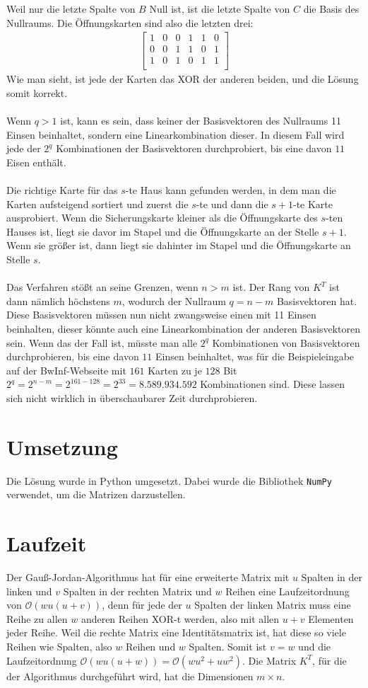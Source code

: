 \documentclass[a4paper,10pt,ngerman]{scrartcl}
\begin{document}
Weil nur die letzte Spalte von $B$ Null ist, ist die letzte Spalte von $C$ die Basis des Nullraums. Die Öffnungskarten sind also die letzten drei:
\begin{align*}
\left[\begin{array}{cccccc}
1 & 0 & 0 & 1 & 1 & 0 \\
0 & 0 & 1 & 1 & 0 & 1 \\
1 & 0 & 1 & 0 & 1 & 1 \\
\end{array}\right]
\end{align*}
Wie man sieht, ist jede der Karten das XOR der anderen beiden, und die Lösung somit korrekt. \\\\
Wenn $q>1$ ist, kann es sein, dass keiner der Basisvektoren des Nullraums 11 Einsen beinhaltet, sondern eine Linearkombination dieser. In diesem Fall wird jede der $2^q$ Kombinationen der Basisvektoren durchprobiert, bis eine davon $11$ Eisen enthält.\\\\
Die richtige Karte für das $s$-te Haus kann gefunden werden, in dem man die Karten aufsteigend sortiert und zuerst die $s$-te und dann die $s+1$-te Karte ausprobiert. Wenn die Sicherungskarte kleiner als die Öffnungskarte des $s$-ten Hauses ist, liegt sie davor im Stapel und die Öffnungskarte an der Stelle $s+1$. Wenn sie größer ist, dann liegt sie dahinter im Stapel und die Öffnungskarte an Stelle $s$.\\
\\
Das Verfahren stößt an seine Grenzen, wenn $n>m$ ist. Der Rang von $K^T$ ist dann nämlich höchstens $m$, wodurch der Nullraum $q=n-m$ Basisvektoren hat. Diese Basisvektoren müssen nun nicht zwangsweise einen mit 11 Einsen beinhalten, dieser könnte auch eine Linearkombination der anderen Basisvektoren sein. Wenn das der Fall ist, müsste man alle $2^q$ Kombinationen von Basisvektoren durchprobieren, bis eine davon $11$ Einsen beinhaltet, was für die Beispieleingabe auf der BwInf-Webseite mit $161$ Karten zu je $128$ Bit $2^q=2^{n-m}=2^{161-128}=2^{33}=8.589.934.592$ Kombinationen sind. Diese lassen sich nicht wirklich in überschaubarer Zeit durchprobieren.
\section{Umsetzung}
Die Lösung wurde in Python umgesetzt. Dabei wurde die Bibliothek \lstinline|NumPy| verwendet, um die Matrizen darzustellen. 
\section{Laufzeit}
Der Gauß-Jordan-Algorithmus hat für eine erweiterte Matrix mit $u$ Spalten in der linken und $v$ Spalten in der rechten Matrix und $w$ Reihen eine Laufzeitordnung von $\mathcal{O}(wu(u+v))$, denn für jede der $u$ Spalten der linken Matrix muss eine Reihe zu allen $w$ anderen Reihen XOR-t werden, also mit allen $u+v$ Elementen jeder Reihe. Weil die rechte Matrix eine Identitätsmatrix ist, hat diese so viele Reihen wie Spalten, also $w$ Reihen und $w$ Spalten. Somit ist $v=w$ und die Laufzeitordnung $\mathcal{O}(wu(u+w))=\mathcal{O}(wu^2+uw^2)$. Die Matrix $K^T$, für die der Algorithmus durchgeführt wird, hat die Dimensionen $m \times n$. 
\end{document}
